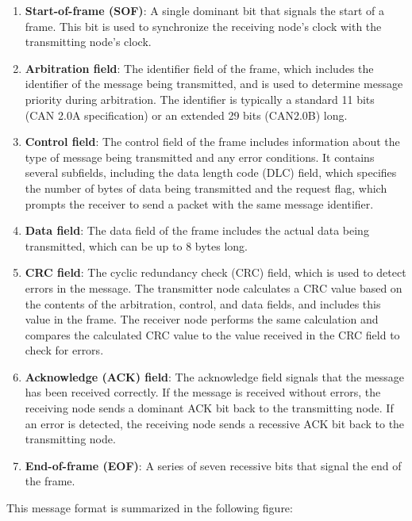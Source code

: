 \documentclass[12pt]{article}
\begin{document}
 \begin{enumerate}
    \item \textbf{Start-of-frame (SOF)}: A single dominant bit that signals the start of a frame. 
    This bit is used to synchronize the receiving node's clock with the transmitting node's clock.
    \item \textbf{Arbitration field}: The identifier field of the frame, which includes the identifier of the message being transmitted, and is used to determine message priority during arbitration. 
    The identifier is typically a standard 11 bits (CAN 2.0A specification) or an extended 29 bits (CAN2.0B) long.
    \item \textbf{Control field}: The control field of the frame includes information about the type of message being transmitted and any error conditions.
    It contains several subfields, including the data length code (DLC) field, which specifies the number of bytes of data being transmitted and the request flag, which prompts the receiver to send a packet with the same message identifier. 
    \item \textbf{Data field}: The data field of the frame includes the actual data being transmitted, which can be up to 8 bytes long.
    \item \textbf{CRC field}: The cyclic redundancy check (CRC) field, which is used to detect errors in the message. 
    The transmitter node calculates a CRC value based on the contents of the arbitration, control, and data fields, and includes this value in the frame.
    The receiver node performs the same calculation and compares the calculated CRC value to the value received in the CRC field to check for errors.
    \item \textbf{Acknowledge (ACK) field}: The acknowledge field signals that the message has been received correctly. 
    If the message is received without errors, the receiving node sends a dominant ACK bit back to the transmitting node. 
    If an error is detected, the receiving node sends a recessive ACK bit back to the transmitting node.
    \item \textbf{End-of-frame (EOF)}: A series of seven recessive bits that signal the end of the frame.
 \end{enumerate}

 This message format is summarized in the following figure:
 
\end{document}
